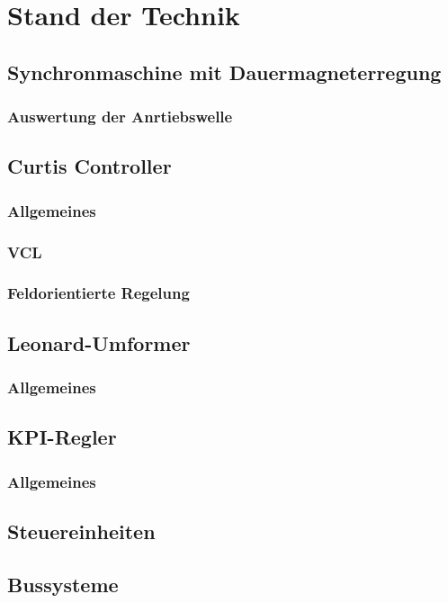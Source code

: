 \chapter{Stand der Technik}

\section{Synchronmaschine mit Dauermagneterregung}
\subsection{Auswertung der Anrtiebswelle}

\section{Curtis Controller}

\subsection{Allgemeines}
\subsection{VCL}
\subsection{Feldorientierte Regelung}

\section{Leonard-Umformer}

\subsection{Allgemeines}
\subsection{ }

\section{KPI-Regler}

\subsection{Allgemeines}
\subsection{ }

\section{Steuereinheiten}

\section{Bussysteme}

